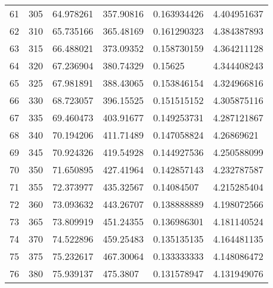 \documentclass[../Matt_Gebert_Honours_Thesis.tex]{subfiles}
\begin{document}
\begin{longtable}[c]{l|lllll}
	61  & 305                     & 64.978261               & 357.90816 & 0.163934426             & 4.404951637            \\
	62  & 310                     & 65.735166               & 365.48169 & 0.161290323             & 4.384387893            \\
	63  & 315                     & 66.488021               & 373.09352 & 0.158730159             & 4.364211128            \\
	64  & 320                     & 67.236904               & 380.74329 & 0.15625                 & 4.344408243            \\
	65  & 325                     & 67.981891               & 388.43065 & 0.153846154             & 4.324966816            \\
	66  & 330                     & 68.723057               & 396.15525 & 0.151515152             & 4.305875116            \\
	67  & 335                     & 69.460473               & 403.91677 & 0.149253731             & 4.287121867            \\
	68  & 340                     & 70.194206               & 411.71489 & 0.147058824             & 4.26869621             \\
	69  & 345                     & 70.924326               & 419.54928 & 0.144927536             & 4.250588099            \\
	70  & 350                     & 71.650895               & 427.41964 & 0.142857143             & 4.232787587            \\
	71  & 355                     & 72.373977               & 435.32567 & 0.14084507              & 4.215285404            \\
	72  & 360                     & 73.093632               & 443.26707 & 0.138888889             & 4.198072566            \\
	73  & 365                     & 73.809919               & 451.24355 & 0.136986301             & 4.181140524            \\
	74  & 370                     & 74.522896               & 459.25483 & 0.135135135             & 4.164481135            \\
	75  & 375                     & 75.232617               & 467.30064 & 0.133333333             & 4.148086472            \\
	76  & 380                     & 75.939137               & 475.3807  & 0.131578947             & 4.131949076            \\

\end{longtable}
\end{document}
